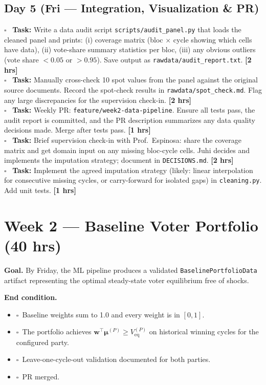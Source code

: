 \documentclass[11pt]{article}
\newcommand{\hrs}[1]{\textbf{[#1 hrs]}}
\newcommand{\veq}{V_{\mathrm{eq}}}
\newcommand{\boldmu}{\boldsymbol{\mu}}
\newcommand{\dayhead}[2]{%
  \subsection*{Day #1 \normalfont\small\color{codegray}(#2)}}
\newcommand{\task}[2]{%
  \noindent\textbf{Task:} #1 \hfill \hrs{#2}\\}
\newcommand{\done}{\textcolor{sectionblue}{$\square$}\ }
\begin{document}
\dayhead{5}{Fri --- Integration, Visualization \& PR}

\begin{taskbox}
\done \task{Write a data audit script \texttt{scripts/audit\_panel.py} that loads
  the cleaned panel and prints: (i) coverage matrix (bloc $\times$ cycle showing
  which cells have data), (ii) vote-share summary statistics per bloc, (iii) any
  obvious outliers (vote share $< 0.05$ or $> 0.95$). Save output as
  \texttt{rawdata/audit\_report.txt}.}{2}

\done \task{Manually cross-check 10 spot values from the panel against the
  original source documents. Record the spot-check results in
  \texttt{rawdata/spot\_check.md}. Flag any large discrepancies for the
  supervision check-in.}{2}

\done \task{Weekly PR: \texttt{feature/week2-data-pipeline}. Ensure all tests
  pass, the audit report is committed, and the PR description summarizes any
  data quality decisions made. Merge after tests pass.}{1}

\done \task{Brief supervision check-in with Prof.\ Espinosa: share the coverage
  matrix and get domain input on any missing bloc-cycle cells. Juhi decides
  and implements the imputation strategy; document in \texttt{DECISIONS.md}.}{2}

\done \task{Implement the agreed imputation strategy (likely: linear interpolation
  for consecutive missing cycles, or carry-forward for isolated gaps) in
  \texttt{cleaning.py}. Add unit tests.}{1}
\end{taskbox}

\newpage

\section{Week 2 --- Baseline Voter Portfolio (40 hrs)}

\textbf{Goal.} By Friday, the ML pipeline produces a validated
\texttt{BaselinePortfolioData} artifact representing the optimal steady-state
voter equilibrium free of shocks.

\textbf{End condition.}
\begin{itemize}[leftmargin=1.6em, itemsep=1pt]
  \item \done Baseline weights sum to 1.0 and every weight is in $[0, 1]$.
  \item \done The portfolio achieves $\mathbf{w}^\top\boldmu^{(P)} \geq \veq^{(P)}$
        on historical winning cycles for the configured party.
  \item \done Leave-one-cycle-out validation documented for both parties.
  \item \done PR merged.
\end{itemize}
\end{document}
